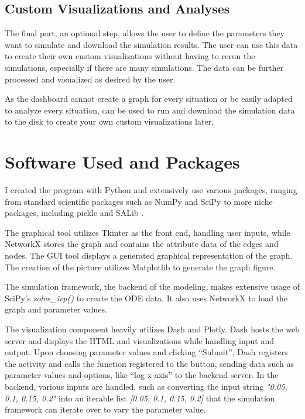 \subsection{Custom Visualizations and Analyses} 
\label{sec:custom_visualizations_and_framework}
The final part, an optional step, allows the user to define the parameters they want to simulate and download the simulation results. 
The user can use this data to create their own custom visualizations without having to rerun the simulations, especially if there are many simulations. 
The data can be further processed and visualized as desired by the user. 

As the dashboard cannot create a graph for every situation or be easily adapted to analyze every situation,  can be used to run and download the simulation data to the disk to create your own custom visualizations later. 

\section{Software Used and Packages}
I created the program with Python \cite{Python} and extensively use various packages, ranging from standard scientific packages such as NumPy \cite{NumPy} and SciPy to more niche packages, including pickle and SALib \cite{iwanagaSALib20Advancing2022, hermanSALibOpensourcePython2017}.

The graphical tool utilizes Tkinter as the front end, handling user inputs, while NetworkX \cite{hagbergExploringNetworkStructure2008} stores the graph and contains the attribute data of the edges and nodes. 
The GUI tool displays a generated graphical representation of the graph. 
The creation of the picture utilizes Matplotlib \cite{Matplotlib} to generate the graph figure. 

The simulation framework, the backend of the modeling, makes extensive usage of SciPy's \textit{solve\_ivp()} to create the ODE data. 
It also uses NetworkX to load the graph and parameter values. 

The visualization component heavily utilizes Dash and Plotly. 
Dash hosts the web server and displays the HTML and visualizations while handling input and output. 
Upon choosing parameter values and clicking “Submit”, Dash registers the activity and calls the function registered to the button, sending data such as parameter values and options, like “log x-axis” to the backend server. 
In the backend, various inputs are handled, such as converting the input string \textit{"0.05, 0.1, 0.15, 0.2"} into an iterable list \textit{[0.05, 0.1, 0.15, 0.2]} that the simulation framework can iterate over to vary the parameter value. 

